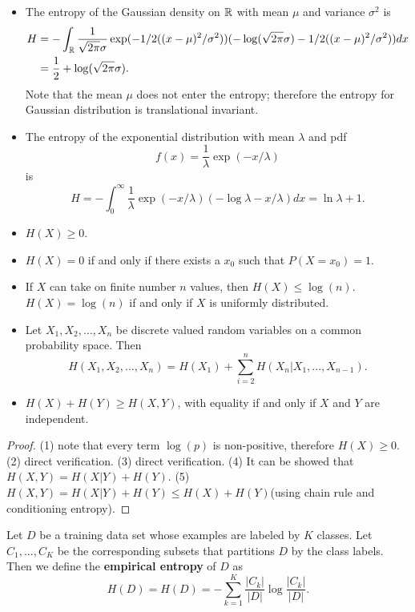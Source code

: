 \begin{refsection}
\begin{example}\hfill
	\begin{itemize}
		\item The entropy of the Gaussian density on $\mathbb{R}$ with mean $\mu$ and variance $\sigma^2$ is
		\begin{align*}
		H &= -\int_{\mathbb{R}} \frac{1}{\sqrt{2\pi}\sigma} \exp(-1/2((x-\mu)^2/\sigma^2))(-\log(\sqrt{2\pi}\sigma) -1/2((x-\mu)^2/\sigma^2))dx \\
		&= \frac{1}{2} + \log(\sqrt{2\pi}\sigma).
		\end{align*}
		Note that the mean $\mu$ does not enter the entropy; therefore the entropy for Gaussian distribution is translational invariant.
		\item The entropy of the exponential distribution with mean $\lambda$ and pdf
		$$f(x) = \frac{1}{\lambda}\exp(-x/\lambda)$$
		is
		$$H = -\int_0^\infty \frac{1}{\lambda} \exp(-x/\lambda)(-\log \lambda -x/\lambda) dx = \ln \lambda + 1.$$
	\end{itemize}	
\end{example}



\begin{lemma}\hfill
	\begin{itemize}
		\item $H(X) \geq 0$.
		\item $H(X) = 0$ if and only if there exists a $x_0$ such that $P(X=x_0) = 1$.
		\item If $X$ can take on finite number $n$ values, then $H(X) \leq \log(n)$. $H(X) = \log(n)$ if and only if $X$ is uniformly distributed. 
		\item Let $X_1,X_2,...,X_n$ be discrete valued random variables on a common probability space. Then
		$$H(X_1,X_2,...,X_n) = H(X_1) + \sum_{i=2}^n H(X_n|X_1,...,X_{n-1}).$$
		\item $H(X) + H(Y) \geq H(X,Y)$, with equality if and only if $X$ and $Y$ are independent.
	\end{itemize}
\end{lemma}
\begin{proof}
	(1) note that every term $\log(p)$ is non-positive, therefore $H(X) \geq 0$. (2) direct verification. (3)  direct verification. (4) It can be showed that $H(X,Y) = H(X|Y) + H(Y)$. (5) $H(X,Y) = H(X|Y) + H(Y) \leq H(X) + H(Y)$(using chain rule and conditioning entropy). 
\end{proof}


\begin{definition}\label{ch:StatisticalLearning:TreeMethods:def:empiricalEntropy}
Let $D$ be a training data set whose examples are labeled by $K$ classes. Let $C_1,...,C_K$ be the corresponding subsets that partitions $D$ by the class labels. Then we define the \textbf{empirical entropy} of $D$ as
$$H(D) = H(D)=-\sum_{k=1}^{K} \frac{\left|C_{k}\right|}{|D|} \log \frac{\left|C_{k}\right|}{|D|}.$$	
\end{definition}



\end{refsection}
